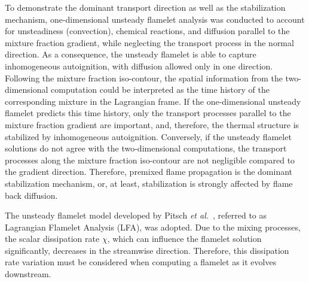 To demonstrate the dominant transport direction as well as the stabilization mechanism, one-dimensional unsteady flamelet analysis was conducted to account for unsteadiness (convection), chemical reactions, and diffusion parallel to the mixture fraction gradient, while neglecting the transport process in the normal direction.  As a consequence, the unsteady flamelet is able to capture inhomogeneous autoignition, with diffusion allowed only in one direction.  Following the mixture fraction iso-contour, the spatial information from the two-dimensional computation could be interpreted as the time history of the corresponding mixture in the Lagrangian frame.  If the one-dimensional unsteady flamelet predicts this time history, only the transport processes parallel to the mixture fraction gradient are important, and, therefore, the thermal structure is stabilized by inhomogeneous autoignition.  Conversely, if the unsteady flamelet solutions do not agree with the two-dimensional computations, the transport processes along the mixture fraction iso-contour are not negligible compared to the gradient direction.  Therefore, premixed flame propagation is the dominant stabilization mechanism, or, at least, stabilization is strongly affected by flame back diffusion.

The unsteady flamelet model developed by Pitsch \emph{et al.}~\cite{pitsch98a}, referred to as Lagrangian Flamelet Analysis (LFA), was adopted.  Due to the mixing processes, the scalar dissipation rate $\chi$, which can influence the flamelet solution significantly, decreases in the streamwise direction.  Therefore, this dissipation rate variation must be considered when computing a flamelet as it evolves downstream.

